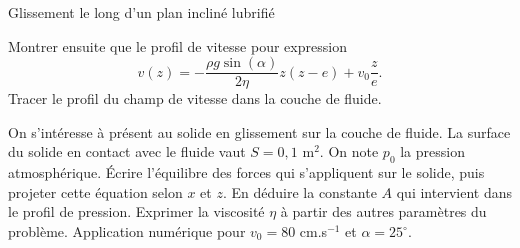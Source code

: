 \begin{exo}[PSI][1]{Glissement le long d’un plan incliné lubrifié}
\begin{quest}



\item Montrer ensuite que le profil de vitesse pour expression
\begin{equation}
v(z) = -\dfrac{\rho g \sin(\alpha)}{2 \eta}z(z-e) + v_0 \dfrac{z}{e}.
\end{equation}
Tracer le profil du champ de vitesse dans la couche de fluide.




\item On s'intéresse à présent au solide en glissement sur la couche de fluide. La surface du solide en contact avec le fluide vaut $S=0,\!1$ m$^2$. On note $p_0$ la pression atmosphérique. Écrire l'équilibre des forces qui s'appliquent sur le solide, puis projeter cette équation selon $x$ et $z$. En déduire la constante $A$ qui intervient dans le profil de pression. Exprimer la viscosité $\eta$ à partir des autres paramètres du problème. Application numérique pour $v_0=80$ cm.s$^{-1}$ et $\alpha = 25^\circ$.

\end{quest}
\end{exo}

